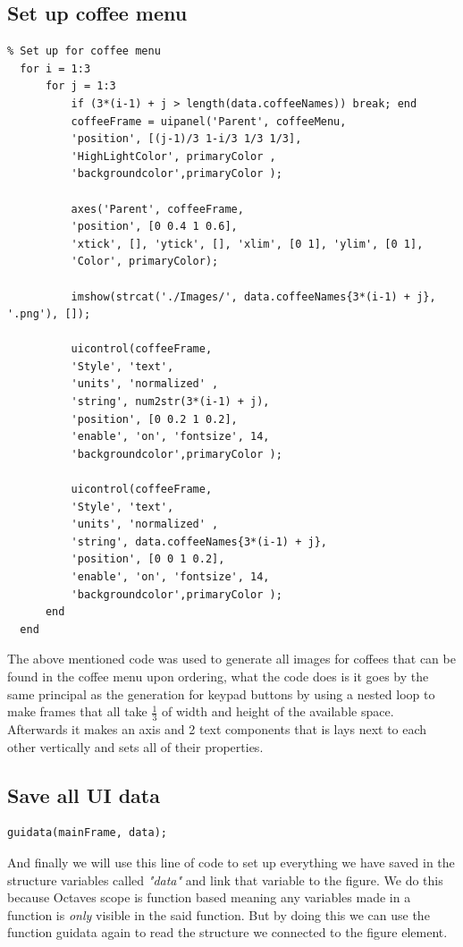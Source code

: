 \documentclass[a4paper, 10pt]{article}
\begin{document}
		\subsection{Set up coffee menu}
		\begin{lstlisting}
% Set up for coffee menu
  for i = 1:3
	  for j = 1:3
		  if (3*(i-1) + j > length(data.coffeeNames)) break; end
		  coffeeFrame = uipanel('Parent', coffeeMenu,
		  'position', [(j-1)/3 1-i/3 1/3 1/3],
		  'HighLightColor', primaryColor ,
		  'backgroundcolor',primaryColor );

		  axes('Parent', coffeeFrame,
		  'position', [0 0.4 1 0.6],
		  'xtick', [], 'ytick', [], 'xlim', [0 1], 'ylim', [0 1],
		  'Color', primaryColor);

		  imshow(strcat('./Images/', data.coffeeNames{3*(i-1) + j}, '.png'), []);

		  uicontrol(coffeeFrame,
		  'Style', 'text',
		  'units', 'normalized' ,
		  'string', num2str(3*(i-1) + j),
		  'position', [0 0.2 1 0.2],
		  'enable', 'on', 'fontsize', 14,
		  'backgroundcolor',primaryColor );

		  uicontrol(coffeeFrame,
		  'Style', 'text',
		  'units', 'normalized' ,
		  'string', data.coffeeNames{3*(i-1) + j},
		  'position', [0 0 1 0.2],
		  'enable', 'on', 'fontsize', 14,
		  'backgroundcolor',primaryColor );
	  end
  end
		\end{lstlisting}

		\vspace{3mm}
		\noindent The above mentioned code was used to generate all images for coffees that can be found in the coffee menu upon ordering, what the code does is it goes by the same principal as the generation for keypad buttons by using a nested loop to
		make frames that all take $\frac{1}{3}$ of width and height of the available space. Afterwards it makes an axis and 2 text components that is lays next to each other vertically and sets all of their properties. \\
		\hline
		
		\subsection{Save all UI data}
		\begin{lstlisting}
guidata(mainFrame, data);
		\end{lstlisting}

		\noindent And finally we will use this line of code to set up everything we have saved in the structure variables called \emph{"data"} and link that variable to the figure. We do this because Octaves scope is function based meaning any variables made
		in a function is \emph{only} visible in the said function. But by doing this we can use the function guidata again to read the structure we connected to the figure element.
\end{document}
